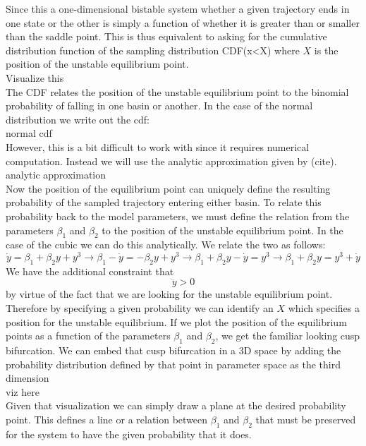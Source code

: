 \documentclass[12pt, a4paper]{article}
\begin{document}
Since this a one-dimensional bistable system whether a given trajectory ends
in one state or the other is simply a function of whether it is greater than
or smaller than the saddle point. This is thus equivalent to asking for the
cumulative distribution function of the sampling distribution CDF(x<X) where
$X$ is the position of the unstable equilibrium point.
\\Visualize this\\
The CDF relates the position of the unstable equilibrium point to the 
binomial probability of falling in one basin or another. In the case of the
normal distribution we write out the cdf:
\\normal cdf\\
However, this is a bit difficult to work with since it requires numerical 
computation. Instead we will use the analytic approximation given by (cite).
\\analytic approximation\\
Now the position of the equilibrium point can uniquely define the resulting
probability of the sampled trajectory entering either basin. To relate this
probability back to the model parameters, we must define the relation from
the parameters $\beta_1$ and $\beta_2$ to the position of the unstable
equilibrium point. In the case of the cubic we can do this analytically.
We relate the two as follows:
\[
    \dot{y} = \beta_1 + \beta_2 y + y^3
    \rightarrow \beta_1-\dot{y}=-\beta_2 y + y^3
    \rightarrow \beta_1 + \beta_2 y -\dot{y}=y^3
    \rightarrow \beta_1+\beta_2 y= y^3 + \dot{y}
\]
We have the additional constraint that
\[
    \ddot{y} > 0
\]
by virtue of the fact that we are looking for the unstable equilibrium point.
Therefore by specifying a given probability we can identify an $X$ which
specifies a position for the unstable equilibrium. If we plot the position
of the equilibrium points as a function of the parameters $\beta_1$ and $\beta_2$,
we get the familiar looking cusp bifurcation. We can embed that cusp bifurcation
in a 3D space by adding the probability distribution defined by that point in 
parameter space as the third dimension
\\viz here\\
Given that visualization we can simply draw a plane at the desired probability point.
This defines a line or a relation between $\beta_1$ and $\beta_2$ that must be
preserved for the system to have the given probability that it does. 
\end{document}
